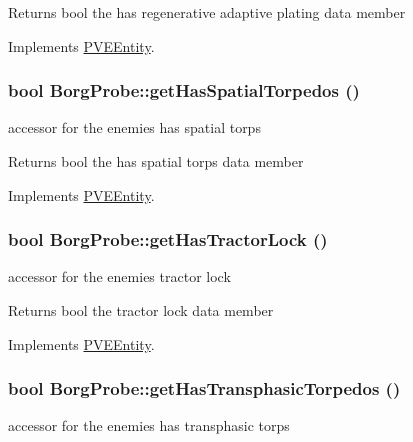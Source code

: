 \begin{DoxyReturn}{Returns}
bool the has regenerative adaptive plating data member 
\end{DoxyReturn}


Implements \hyperlink{classPVEEntity}{PVEEntity}.

\hypertarget{classBorgProbe_afefc3c2911ff75c7d02a8fd4390a9bfd}{
\subsubsection[{getHasSpatialTorpedos}]{\setlength{\rightskip}{0pt plus 5cm}bool BorgProbe::getHasSpatialTorpedos ()}}
\label{db/deb/classBorgProbe_afefc3c2911ff75c7d02a8fd4390a9bfd}
accessor for the enemies has spatial torps

\begin{DoxyReturn}{Returns}
bool the has spatial torps data member 
\end{DoxyReturn}


Implements \hyperlink{classPVEEntity}{PVEEntity}.

\hypertarget{classBorgProbe_a3e0cfde0db3e63c1405afe14699b3122}{
\subsubsection[{getHasTractorLock}]{\setlength{\rightskip}{0pt plus 5cm}bool BorgProbe::getHasTractorLock ()}}
\label{db/deb/classBorgProbe_a3e0cfde0db3e63c1405afe14699b3122}
accessor for the enemies tractor lock

\begin{DoxyReturn}{Returns}
bool the tractor lock data member 
\end{DoxyReturn}


Implements \hyperlink{classPVEEntity}{PVEEntity}.

\hypertarget{classBorgProbe_a304d8f8cc7fb8f1d47ab5edf6fe02ba6}{
\subsubsection[{getHasTransphasicTorpedos}]{\setlength{\rightskip}{0pt plus 5cm}bool BorgProbe::getHasTransphasicTorpedos ()}}
\label{db/deb/classBorgProbe_a304d8f8cc7fb8f1d47ab5edf6fe02ba6}
accessor for the enemies has transphasic torps

